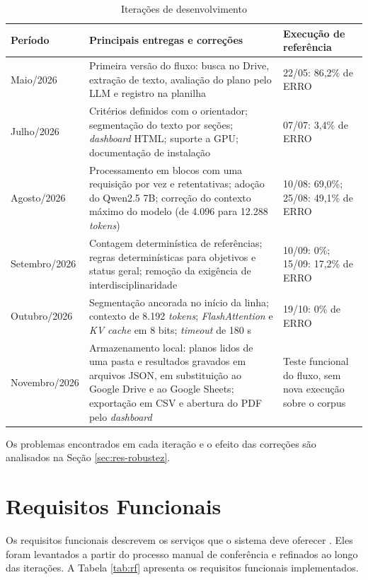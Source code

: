 \begin{table}[H]
\centering
\caption{Iterações de desenvolvimento}
\label{tab:iteracoes}
\footnotesize
\begin{tabular}{@{}L{2.4cm}L{9.1cm}L{2.9cm}@{}}
\toprule
{}
\textbf{Período} & \textbf{Principais entregas e correções} & \textbf{Execução de referência} \\ \midrule
Maio/2026 & Primeira versão do fluxo: busca no Drive, extração de texto, avaliação do plano pelo LLM e registro na planilha & 22/05: 86,2\% de ERRO \\
Julho/2026 & Critérios definidos com o orientador; segmentação do texto por seções; \textit{dashboard} HTML; suporte a GPU; documentação de instalação & 07/07: 3,4\% de ERRO \\
Agosto/2026 & Processamento em blocos com uma requisição por vez e retentativas; adoção do Qwen2.5 7B; correção do contexto máximo do modelo (de 4.096 para 12.288 \textit{tokens}) & 10/08: 69,0\%; 25/08: 49,1\% de ERRO \\
Setembro/2026 & Contagem determinística de referências; regras determinísticas para objetivos e status geral; remoção da exigência de interdisciplinaridade & 10/09: 0\%; 15/09: 17,2\% de ERRO \\
Outubro/2026 & Segmentação ancorada no início da linha; contexto de 8.192 \textit{tokens}; \textit{FlashAttention} e \textit{KV cache} em 8 bits; \textit{timeout} de 180 s & 19/10: 0\% de ERRO \\
Novembro/2026 & Armazenamento local: planos lidos de uma pasta e resultados gravados em arquivos JSON, em substituição ao Google Drive e ao Google Sheets; exportação em CSV e abertura do PDF pelo \textit{dashboard} & Teste funcional do fluxo, sem nova execução sobre o corpus \\ \bottomrule
\end{tabular}
\end{table}

Os problemas encontrados em cada iteração e o efeito das correções são analisados na Seção \ref{sec:res-robustez}.

\section{Requisitos Funcionais}
\label{sec:rf}

Os requisitos funcionais descrevem os serviços que o sistema deve oferecer \cite{Sommerville2016}. Eles foram levantados a partir do processo manual de conferência e refinados ao longo das iterações. A Tabela \ref{tab:rf} apresenta os requisitos funcionais implementados.

